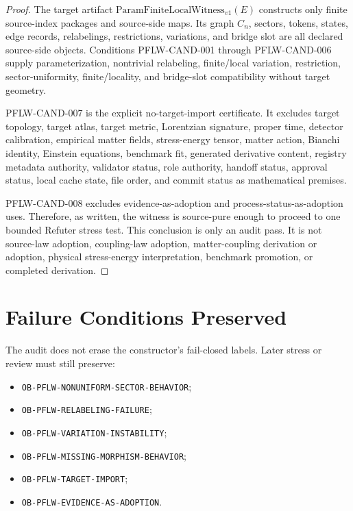 \documentclass[11pt]{article}
\newcommand{\PFLFW}{\mathrm{ParamFiniteLocalWitness}_{v1}}
\begin{document}
\begin{proof}
The target artifact \(\PFLFW(E)\) constructs only finite source-index
packages and source-side maps. Its graph \(C_n\), sectors, tokens, states,
edge records, relabelings, restrictions, variations, and bridge slot are all
declared source-side objects. Conditions PFLW-CAND-001 through
PFLW-CAND-006 supply parameterization, nontrivial relabeling, finite/local
variation, restriction, sector-uniformity, finite/locality, and bridge-slot
compatibility without target geometry.

PFLW-CAND-007 is the explicit no-target-import certificate. It excludes
target topology, target atlas, target metric, Lorentzian signature, proper
time, detector calibration, empirical matter fields, stress-energy tensor,
matter action, Bianchi identity, Einstein equations, benchmark fit,
generated derivative content, registry metadata authority, validator status,
role authority, handoff status, approval status, local cache state, file
order, and commit status as mathematical premises.

PFLW-CAND-008 excludes evidence-as-adoption and process-status-as-adoption
uses. Therefore, as written, the witness is source-pure enough to proceed to
one bounded Refuter stress test. This conclusion is only an audit pass. It is
not source-law adoption, coupling-law adoption, matter-coupling derivation or
adoption, physical stress-energy interpretation, benchmark promotion, or
completed derivation.
\end{proof}

\section{Failure Conditions Preserved}

The audit does not erase the constructor's fail-closed labels. Later stress
or review must still preserve:

\begin{itemize}[leftmargin=*]
  \item \texttt{OB-PFLW-NONUNIFORM-SECTOR-BEHAVIOR};
  \item \texttt{OB-PFLW-RELABELING-FAILURE};
  \item \texttt{OB-PFLW-VARIATION-INSTABILITY};
  \item \texttt{OB-PFLW-MISSING-MORPHISM-BEHAVIOR};
  \item \texttt{OB-PFLW-TARGET-IMPORT};
  \item \texttt{OB-PFLW-EVIDENCE-AS-ADOPTION}.
\end{itemize}
\end{document}
